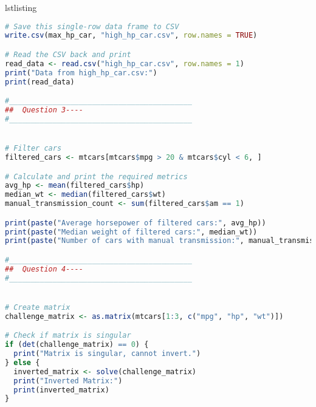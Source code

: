 \begin{frame}[fragile]{lstlisting}
\begin{lstlisting}[language=R]
# Save this single-row data frame to CSV
write.csv(max_hp_car, "high_hp_car.csv", row.names = TRUE)

# Read the CSV back and print
read_data <- read.csv("high_hp_car.csv", row.names = 1)
print("Data from high_hp_car.csv:")
print(read_data)

#__________________________________________
##  Question 3----   
#__________________________________________ 


# Filter cars
filtered_cars <- mtcars[mtcars$mpg > 20 & mtcars$cyl < 6, ]

# Calculate and print the required metrics
avg_hp <- mean(filtered_cars$hp)
median_wt <- median(filtered_cars$wt)
manual_transmission_count <- sum(filtered_cars$am == 1)

print(paste("Average horsepower of filtered cars:", avg_hp))
print(paste("Median weight of filtered cars:", median_wt))
print(paste("Number of cars with manual transmission:", manual_transmission_count))

#__________________________________________
##  Question 4----   
#__________________________________________ 


# Create matrix
challenge_matrix <- as.matrix(mtcars[1:3, c("mpg", "hp", "wt")])

# Check if matrix is singular
if (det(challenge_matrix) == 0) {
  print("Matrix is singular, cannot invert.")
} else {
  inverted_matrix <- solve(challenge_matrix)
  print("Inverted Matrix:")
  print(inverted_matrix)
}


\end{lstlisting}
\end{frame}
